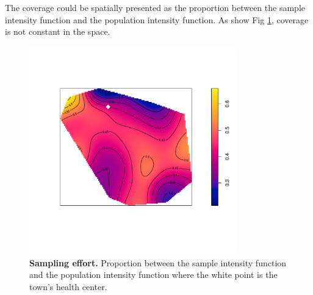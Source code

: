 \documentclass[10pt,letterpaper]{article}
\begin{document}
The coverage could be spatially presented as the proportion between the sample intensity function and the population intensity function. As show Fig \ref{samp_eff}, coverage is not constant in the space.
\begin{figure}[h]
\centering
\includegraphics[width=9cm]{images/sampling_effort.pdf}
\caption{{\bf Sampling effort.} Proportion between the sample intensity function and the population intensity function where the white point is the town's health center.}
\label{samp_eff}
\end{figure}
\end{document}
